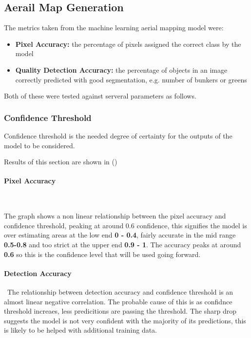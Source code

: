 \documentclass[final]{cmpreport_02}
\begin{document}
\subsection{Aerail Map Generation}
The metrics taken from the machine learning aerial mapping model were:
\begin{itemize}
    \item{\textbf{Pixel Accuracy:} the percentage of pixels assigned the correct class by the model}
    \item{\textbf{Quality Detection Accuracy:} the percentage of objects in an image correctly predicted with good segmentation, e.g. number of bunkers or greens}
\end{itemize}
Both of these were tested against serveral parameters as follows.

\subsubsection{Confidence Threshold} \label{confidenceThresholdEval}

Confidence threshold is the needed degree of certainty for the outputs of the model to be considered.

Results of this section are shown in ()

\paragraph{Pixel Accuracy} \

The graph shows a non linear relationship between the pixel accuracy and confidence threshold, peaking at around 0.6 confidence, this signifies the model is over estimating areas at the low end \textbf{0 - 0.4}, fairly accurate in the mid range \textbf{0.5-0.8} and too strict at the upper end \textbf{0.9 - 1}.
The accuracy peaks at around \textbf{0.6} so this is the confidence level that will be used going forward.

\paragraph{Detection Accuracy} \
The relationship between detection accuracy and confidence threshold is an almost linear negative correlation.
The probable cause of this is as confidnce threshold increaes, less predicitions are passing the threshold.
The sharp drop suggests the model is not very confident with the majority of its predictions, this is likely to be helped with additional training data.
\end{document}
